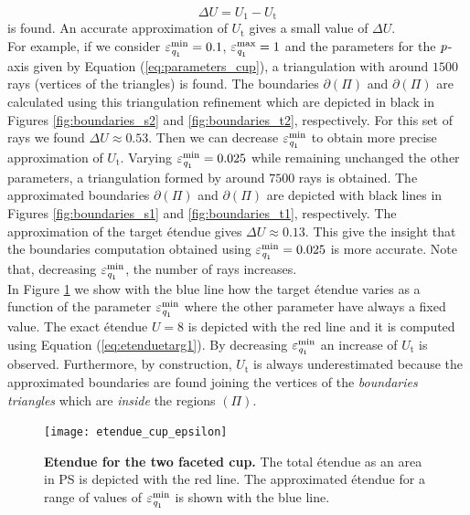 \begin{equation}\label{eq:delta} \Delta U = U_1-U_{\textrm{t}} 
\end{equation} is found.
An accurate approximation of $U_{\textrm{t}}$ gives a small value of $\Delta U$. 
\\ \indent For example, if we consider $\varepsilon_{\textit{q}_1}^{\textrm{min}}=0.1$, $\varepsilon_{\textit{q}_1}^{\textrm{max}}=1$ and the parameters for the $\textit{p}$-axis given by Equation (\ref{eq:parameters_cup}), a triangulation with around $1500$ rays (vertices of the triangles) is found. The boundaries $\partial$$(\Pi)$ and $\partial$$(\Pi)$ are calculated using this triangulation refinement which are depicted in black in Figures \ref{fig:boundaries_s2} and \ref{fig:boundaries_t2}, respectively. For this set of rays we found $\Delta U \approx 0.53 $. Then we can decrease $\varepsilon_{\textit{q}_1}^{\textrm{min}}$ to obtain more precise approximation of $U_{\textrm{t}}$. Varying $\varepsilon_{\textit{q}_1}^{\textrm{min}} = 0.025$ while remaining unchanged the other parameters, a triangulation formed by around $7500$ rays is obtained. The approximated boundaries $\partial$$(\Pi)$ and $\partial$$(\Pi)$ are depicted with black lines in Figures \ref{fig:boundaries_s1} and \ref{fig:boundaries_t1}, respectively. The approximation of the target \'{e}tendue gives $\Delta U \approx 0.13 $.
 This give the insight that the boundaries computation obtained using $\varepsilon_{\textit{q}_1}^{\textrm{min}} = 0.025$ is more accurate. 
Note that, decreasing $\varepsilon_{\textit{q}_1}^{\textrm{min}}$, the number of rays increases. 
\\ \indent In Figure \ref{fig:etendue_cup} we show with the blue line how the target \'{e}tendue varies as a function of the parameter $\varepsilon_{\textit{q}_1}^{\textrm{min}}$ where the other parameter have always a fixed value. The exact \'{e}tendue $U=8$ is depicted with the red line and it is computed using Equation (\ref{eq:etenduetarg1}). By decreasing $\varepsilon_{\textit{q}_1}^{\textrm{min}}$ an increase of $U_{\textrm{t}}$ is observed. Furthermore, by construction, $U_{\textrm{t}}$ is always underestimated because the approximated boundaries are found joining the vertices of the \textit{boundaries triangles} which are \textit{inside} the regions $(\Pi)$.
 \begin{figure}[h!]
  \center
  \texttt{[image: etendue\_cup\_epsilon]}
  \caption{\textbf{Etendue for the two faceted cup.} The total \'{e}tendue as an area in PS is depicted with the red line. The approximated \'{e}tendue for a range of values of 
$\varepsilon_{\textit{q}_1}^{\textrm{min}}$ is shown with the blue line.}
  \label{fig:etendue_cup}
\end{figure}
